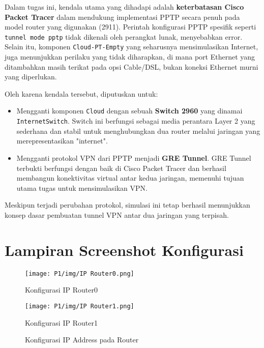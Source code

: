 Dalam tugas ini, kendala utama yang dihadapi adalah \textbf{keterbatasan Cisco Packet Tracer} dalam mendukung implementasi PPTP secara penuh pada model router yang digunakan (2911). Perintah konfigurasi PPTP spesifik seperti \texttt{tunnel mode pptp} tidak dikenali oleh perangkat lunak, menyebabkan error. Selain itu, komponen \texttt{Cloud-PT-Empty} yang seharusnya mensimulasikan Internet, juga menunjukkan perilaku yang tidak diharapkan, di mana port Ethernet yang ditambahkan masih terikat pada opsi Cable/DSL, bukan koneksi Ethernet murni yang diperlukan.

Oleh karena kendala tersebut, diputuskan untuk:
\begin{itemize}
    \item Mengganti komponen \texttt{Cloud} dengan sebuah \textbf{Switch 2960} yang dinamai \texttt{InternetSwitch}. Switch ini berfungsi sebagai media perantara Layer 2 yang sederhana dan stabil untuk menghubungkan dua router melalui jaringan yang merepresentasikan "internet".
    \item Mengganti protokol VPN dari PPTP menjadi \textbf{GRE Tunnel}. GRE Tunnel terbukti berfungsi dengan baik di Cisco Packet Tracer dan berhasil membangun konektivitas virtual antar kedua jaringan, memenuhi tujuan utama tugas untuk mensimulasikan VPN.
\end{itemize}
Meskipun terjadi perubahan protokol, simulasi ini tetap berhasil menunjukkan konsep dasar pembuatan tunnel VPN antar dua jaringan yang terpisah.

\newpage
\appendix
\section*{Lampiran Screenshot Konfigurasi}

\begin{figure}[h!]
    \centering
    \begin{minipage}[t]{0.48\textwidth}
        \centering
        \texttt{[image: P1/img/IP Router0.png]} 
        \caption{Konfigurasi IP Router0}
        \label{lampiran:ip_router0}
    \end{minipage}
    \hfill
    \begin{minipage}[t]{0.48\textwidth}
        \centering
        \texttt{[image: P1/img/IP Router1.png]} 
        \caption{Konfigurasi IP Router1}
        \label{lampiran:ip_router1}
    \end{minipage}
    \caption{Konfigurasi IP Address pada Router}
\end{figure}

